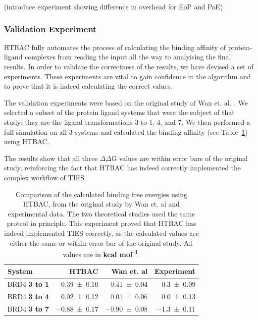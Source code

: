 (introduce experiment showing difference in overhead for EoP and PoE)


\subsubsection{Validation Experiment}

HTBAC fully automates the process of calculating the binding affinity of
protein-ligand complexes from reading the input all the way to analyising the
final results. In order to validate the correctness of the results, we have
devised a set of experiments. These experiments are vital to gain confidence
in the algorithm and to prove that it is indeed calculating the correct
values.

The validation experiments were based on the original study of Wan et. al.
\cite{Wan2017brd4}. We selected a subset of the protein ligand systems that
were the subject of that study: they are the ligand transformations 3 to 1,
4, and 7. We then performed a full simulation on all 3 systems and calculated
the binding affinity (see Table~\ref{tab:exp2}) using HTBAC.

The results show that all three $\Delta \Delta$G values are within error bars
of the original study, reinforcing the fact that HTBAC has indeed correctly
implemented the complex workflow of TIES.

\begin{table}
  \centering
  \begin{tabular}{l@{\hskip 1in}r@{\hskip 0.2in}r@{\hskip 0.2in}r}
    \toprule
    System & HTBAC & Wan et. al & Experiment \\
    \midrule
    BRD4 \textbf{3 to 1} & \num{0.39 +- 0.10} &   \num{0.41 +- 0.04} &  \num{0.3 +- 0.09} \\
    BRD4 \textbf{3 to 4} & \num{0.02 +- 0.12} &   \num{0.01 +- 0.06} &  \num{0.0 +- 0.13} \\
    BRD4 \textbf{3 to 7} & \num{-0.88 +- 0.17} &  \num{-0.90 +- 0.08} & \num{-1.3 +- 0.11} \\
    \bottomrule
  \end{tabular}
  \caption{Comparison of the calculated binding free energies using HTBAC,
  from the original study by Wan et. al and experimental data. The two
  theoretical studies used the same protcol in principle. This experiment
  proved that HTBAC has indeed implemented TIES correctly, as the calculated
  values are either the same or within error bar of the original study. All
  values are in \textbf{kcal mol\textsuperscript{-1}}.}
  \label{tab:exp2}
\end{table}

